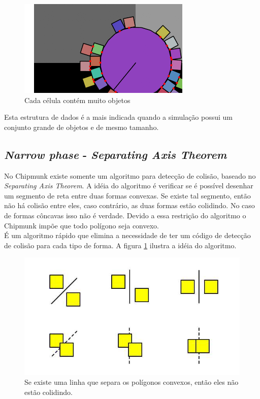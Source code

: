 \begin{figure}[!htbp]
  \centering
  \includegraphics[scale=1]{hash_too_big.png}
  \caption{Cada célula contém muito objetos}
\end{figure}

Esta estrutura de dados é a mais indicada quando a simulação possui um conjunto grande de objetos e de mesmo tamanho.

\subsection{\textit{Narrow phase} - \textit{Separating Axis Theorem}}

No Chipmunk existe somente um algoritmo para detecção de colisão, baseado no \textit{Separating Axis Theorem}. A idéia do algoritmo é verificar se é possível desenhar um segmento 
de reta entre duas formas convexas. Se existe tal segmento, então não há colisão entre eles, caso contrário, as duas formas estão colidindo. No caso de formas
côncavas isso não é verdade. Devido a essa restrição do algoritmo o Chipmunk impõe que todo polígono seja convexo. \\

É um algoritmo rápido que elimina a necessidade de ter um código de detecção de colisão para cada tipo de forma. A figura \ref{narrow} ilustra a idéia do algoritmo.

\begin{figure}[!htbp]
  \centering
  \includegraphics[scale=0.5]{SAT.jpg}
  \caption{Se existe uma linha que separa os polígonos convexos, então eles não estão colidindo.}
  \label{narrow}
\end{figure}
